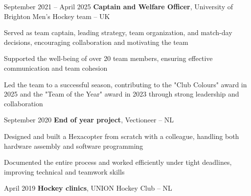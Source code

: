	
	\vspace{0.2 cm}
	
	\begin{twocolentry}{
			September 2021 – April 2025
		}
		\textbf{Captain and Welfare Officer}, University of Brighton Men’s Hockey team -- UK
	\end{twocolentry}
	
	\vspace{0.10 cm}
	\begin{onecolentry}
		\begin{highlights}
			\item Served as team captain, leading strategy, team organization, and match-day decisions, encouraging collaboration and motivating the team
			\item Supported the well-being of over 20 team members, ensuring effective communication and team cohesion
			\item Led the team to a successful season, contributing to the "Club Colours" award in 2025 and the "Team of the Year" award in 2023 through strong leadership and collaboration
		\end{highlights}
	\end{onecolentry}
	
	\vspace{0.2 cm}
	
	\begin{twocolentry}{
			September 2020
		}
		\textbf{End of year project}, Vectioneer -- NL
	\end{twocolentry}
	
	\vspace{0.10 cm}
	\begin{onecolentry}
		\begin{highlights}
			\item Designed and built a Hexacopter from scratch with a colleague, handling both hardware assembly and software programming
			\item Documented the entire process and worked efficiently under tight deadlines, improving technical and teamwork skills
		\end{highlights}
	\end{onecolentry}
	
	\vspace{0.2 cm}
	
	\begin{twocolentry}{
			April 2019
		}
		\textbf{Hockey clinics}, UNION Hockey Club -- NL
	\end{twocolentry}
	
